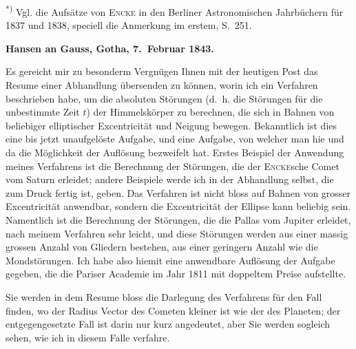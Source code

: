 \documentclass[12pt,a4paper]{article}
\begin{document}
\smallskip\noindent\textsuperscript{*)} Vgl. die Aufsätze von \textsc{Encke} in den Berliner Astronomischen Jahrbüchern für 1837 und 1838, speciell die Anmerkung im erstem, S.~251.

\medskip\noindent
\textbf{Hansen an Gauss, Gotha, 7.~Februar 1843.}

{Es gereicht mir zu besonderm Vergnügen Ihnen mit der heutigen Post das Resume einer Abhandlung übersenden zu können, worin ich ein Verfahren beschrieben habe, um die absoluten Störungen (d.~h. die Störungen für die unbestimmte Zeit $t$) der Himmelskörper zu berechnen, die sich in Bahnen von beliebiger elliptischer Excentricität und Neigung bewegen. Bekanntlich ist dies eine bis jetzt unaufgelöste Aufgabe, und eine Aufgabe, von welcher man hie und da die Möglichkeit der Auflösung bezweifelt hat. Erstes Beispiel der Anwendung meines Verfahrens ist die Berechnung der Störungen, die der \textsc{Encke}sche Comet vom Saturn erleidet; andere Beispiele werde ich in der Abhandlung selbst, die zum Druck fertig ist, geben. Das Verfahren ist nicht bloss auf Bahnen von grosser Excentricität anwendbar, sondern die Excentricität der Ellipse kann beliebig sein. Namentlich ist die Berechnung der Störungen, die die Pallas vom Jupiter erleidet, nach meinem Verfahren sehr leicht, und diese Störungen werden aus einer massig grossen Anzahl von Gliedern bestehen, aus einer geringern Anzahl wie die Mondstörungen. Ich habe also hiemit eine anwendbare Auflösung der Aufgabe gegeben, die die Pariser Academie im Jahr 1811 mit doppeltem Preise aufstellte.}

\newpage
\setcounter{page}{444}
%
Sie werden in dem Resume bloss die Darlegung des Verfahrens für den Fall finden, wo der Radius Vector des Cometen kleiner ist wie der des Planeten; der entgegengesetzte Fall ist darin nur kurz angedeutet, aber Sie werden sogleich sehen, wie ich in diesem Falle verfahre.
\end{document}
